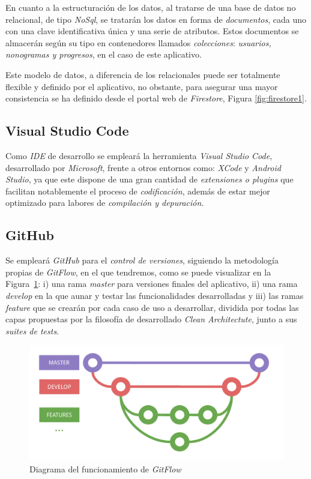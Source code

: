 En cuanto a la estructuración de los datos, al tratarse de una base de datos no relacional,
de tipo \textit{NoSql}, se tratarán los datos en forma de \textit{documentos}, cada uno con una clave identificativa única y una
serie de atributos. Estos documentos se almacerán según su tipo en contenedores llamados \textit{colecciones}:
\textit{usuarios, nonogramas y progresos}, en el caso de este aplicativo.

Este modelo de datos, a diferencia de los relacionales puede ser totalmente flexible y definido por el aplicativo, no obstante,
para asegurar una mayor consistencia se ha definido desde el portal web de \textit{Firestore}, Figura \ref{fig:firestore1}.

  \subsection{Visual Studio Code}
Como \textit{IDE} de desarrollo se empleará la herramienta \textit{Visual Studio Code}, desarrollado por
\textit{Microsoft}, frente a otros entornos como: \textit{XCode} y \textit{Android Studio}, ya que este dispone
de una gran cantidad de \textit{extensiones o plugins} que facilitan notablemente el proceso de \textit{codificación},
además de estar mejor optimizado para labores de \textit{compilación y depuración.}

\subsection{GitHub}
Se empleará \textit{GitHub} para el \textit{control de versiones}, siguiendo la metodología propias de 
\textit{GitFlow}, en el que tendremos, como se puede visualizar en la Figura~\ref{fig:gitflow1}:
i) una rama \textit{master} para versiones finales del aplicativo,
ii) una rama \textit{develop} en la que aunar y testar las funcionalidades desarrolladas y iii) las ramas
\textit{feature} que se crearán por cada caso de uso a desarrollar, dividida por todas las capas propuestas
por la filosofía de desarrollado \textit{Clean Architectute}, junto a sus \textit{suites de tests}.

\begin{figure}[H]
    \centering
    \includegraphics[scale=0.6]{images/gitflow1.pdf}
    \caption{Diagrama del funcionamiento de \textit{GitFlow}}
    \label{fig:gitflow1}
  \end{figure}

